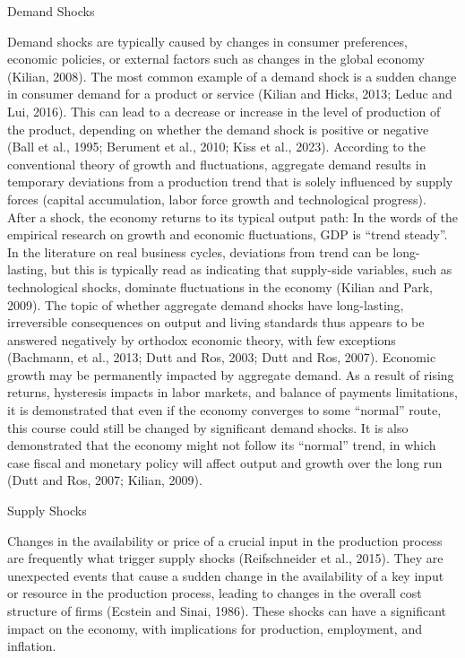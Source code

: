 \documentclass[11pt]{article}
\begin{document}
Demand Shocks

Demand shocks are typically caused by changes in consumer preferences,
economic policies, or external factors such as changes in the global
economy (Kilian, 2008). The most common example of a demand shock is a
sudden change in consumer demand for a product or service (Kilian and
Hicks, 2013; Leduc and Lui, 2016). This can lead to a decrease or
increase in the level of production of the product, depending on whether
the demand shock is positive or negative (Ball et al., 1995; Berument et
al., 2010; Kiss et al., 2023). According to the conventional theory of
growth and fluctuations, aggregate demand results in temporary
deviations from a production trend that is solely influenced by supply
forces (capital accumulation, labor force growth and technological
progress). After a shock, the economy returns to its typical output
path: In the words of the empirical research on growth and economic
fluctuations, GDP is ``trend steady''. In the literature on real
business cycles, deviations from trend can be long-lasting, but this is
typically read as indicating that supply-side variables, such as
technological shocks, dominate fluctuations in the economy (Kilian and
Park, 2009). The topic of whether aggregate demand shocks have
long-lasting, irreversible consequences on output and living standards
thus appears to be answered negatively by orthodox economic theory, with
few exceptions (Bachmann, et al., 2013; Dutt and Ros, 2003; Dutt and
Ros, 2007). Economic growth may be permanently impacted by aggregate
demand. As a result of rising returns, hysteresis impacts in labor
markets, and balance of payments limitations, it is demonstrated that
even if the economy converges to some ``normal'' route, this course
could still be changed by significant demand shocks. It is also
demonstrated that the economy might not follow its ``normal'' trend, in
which case fiscal and monetary policy will affect output and growth over
the long run (Dutt and Ros, 2007; Kilian, 2009).

Supply Shocks

Changes in the availability or price of a crucial input in the
production process are frequently what trigger supply shocks
(Reifschneider et al., 2015). They are unexpected events that cause a
sudden change in the availability of a key input or resource in the
production process, leading to changes in the overall cost structure of
firms (Ecstein and Sinai, 1986). These shocks can have a significant
impact on the economy, with implications for production, employment, and
inflation.
\end{document}
